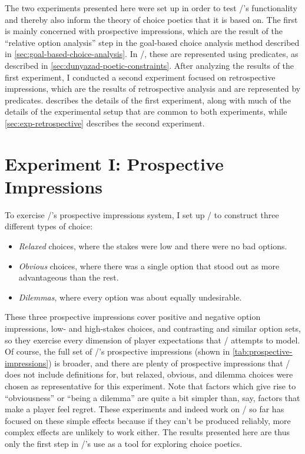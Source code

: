 The two experiments presented here were set up in order to test \dunyazad/'s functionality and thereby also inform the theory of choice poetics that it is based on.
%
The first is mainly concerned with prospective impressions, which are the result of the ``relative option analysis'' step in the goal-based choice analysis method described in \cref{sec:goal-based-choice-analysis}.
%
In \dunyazad/, these are represented using  predicates, as described in \cref{sec:dunyazad-poetic-constraints}.
%
After analyzing the results of the first experiment, I conducted a second experiment focused on retrospective impressions, which are the results of retrospective analysis and are represented by  predicates.
%
 describes the details of the first experiment, along with much of the details of the experimental setup that are common to both experiments, while \cref{sec:exp-retrospective} describes the second experiment.


\section{Experiment I: Prospective Impressions}

\label{sec:exp-prospective}

To exercise \dunyazad/'s prospective impressions system, I set up \dunyazad/ to construct three different types of choice:
%
\begin{itemize}
  \item \emph{Relaxed} choices, where the stakes were low and there were no bad options.
  \item \emph{Obvious} choices, where there was a single option that stood out as more advantageous than the rest.
  \item \emph{Dilemmas}, where every option was about equally undesirable.
\end{itemize}
%
These three prospective impressions cover positive and negative option impressions, low- and high-stakes choices, and contrasting and similar option sets, so they exercise every dimension of player expectations that \dunyazad/ attempts to model.
%
Of course, the full set of \dunyazad/'s prospective impressions (shown in \cref{tab:prospective-impressions}) is broader, and there are plenty of prospective impressions that \dunyazad/ does not include definitions for, but relaxed, obvious, and dilemma choices were chosen as representative for this experiment.
%
Note that factors which give rise to ``obviousness'' or ``being a dilemma'' are quite a bit simpler than, say, factors that make a player feel regret.
%
These experiments and indeed work on \dunyazad/ so far has focused on these simple effects because if they can't be produced reliably, more complex effects are unlikely to work either.
%
The results presented here are thus only the first step in \dunyazad/'s use as a tool for exploring choice poetics.


